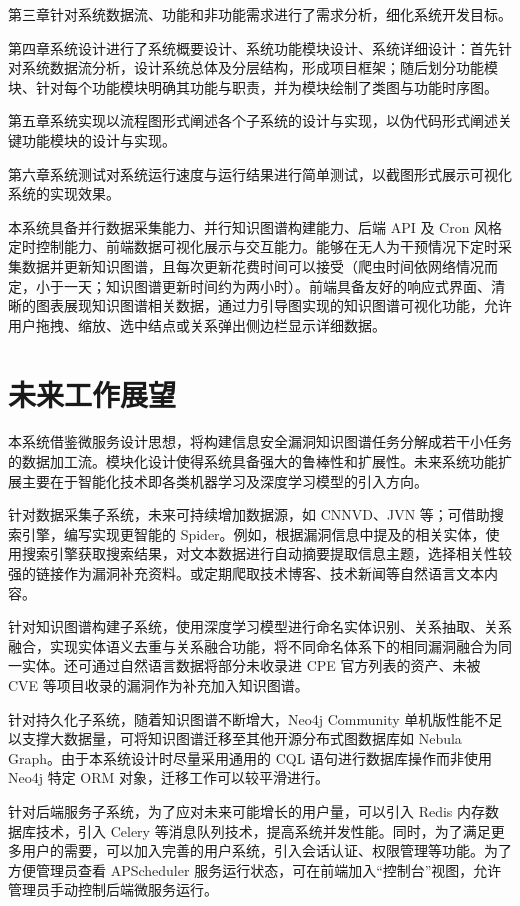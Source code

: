 \documentclass[a4paper,AutoFakeBold,oneside,12pt]{book}
\begin{document}
第三章针对系统数据流、功能和非功能需求进行了需求分析，细化系统开发目标。

第四章系统设计进行了系统概要设计、系统功能模块设计、系统详细设计：首先针对系统数据流分析，设计系统总体及分层结构，形成项目框架；随后划分功能模块、针对每个功能模块明确其功能与职责，并为模块绘制了类图与功能时序图。

第五章系统实现以流程图形式阐述各个子系统的设计与实现，以伪代码形式阐述关键功能模块的设计与实现。

第六章系统测试对系统运行速度与运行结果进行简单测试，以截图形式展示可视化系统的实现效果。

本系统具备并行数据采集能力、并行知识图谱构建能力、后端 API 及 Cron 风格定时控制能力、前端数据可视化展示与交互能力。能够在无人为干预情况下定时采集数据并更新知识图谱，且每次更新花费时间可以接受（爬虫时间依网络情况而定，小于一天；知识图谱更新时间约为两小时）。前端具备友好的响应式界面、清晰的图表展现知识图谱相关数据，通过力引导图实现的知识图谱可视化功能，允许用户拖拽、缩放、选中结点或关系弹出侧边栏显示详细数据。

\section{未来工作展望}

本系统借鉴微服务设计思想，将构建信息安全漏洞知识图谱任务分解成若干小任务的数据加工流。模块化设计使得系统具备强大的鲁棒性和扩展性。未来系统功能扩展主要在于智能化技术即各类机器学习及深度学习模型的引入方向。

针对数据采集子系统，未来可持续增加数据源，如 CNNVD、JVN 等；可借助搜索引擎，编写实现更智能的 Spider。例如，根据漏洞信息中提及的相关实体，使用搜索引擎获取搜索结果，对文本数据进行自动摘要提取信息主题，选择相关性较强的链接作为漏洞补充资料。或定期爬取技术博客、技术新闻等自然语言文本内容。

针对知识图谱构建子系统，使用深度学习模型进行命名实体识别、关系抽取、关系融合，实现实体语义去重与关系融合功能，将不同命名体系下的相同漏洞融合为同一实体。还可通过自然语言数据将部分未收录进 CPE 官方列表的资产、未被 CVE 等项目收录的漏洞作为补充加入知识图谱。

针对持久化子系统，随着知识图谱不断增大，Neo4j Community 单机版性能不足以支撑大数据量，可将知识图谱迁移至其他开源分布式图数据库如 Nebula Graph。由于本系统设计时尽量采用通用的 CQL 语句进行数据库操作而非使用 Neo4j 特定 ORM 对象，迁移工作可以较平滑进行。

针对后端服务子系统，为了应对未来可能增长的用户量，可以引入 Redis 内存数据库技术，引入 Celery 等消息队列技术，提高系统并发性能。同时，为了满足更多用户的需要，可以加入完善的用户系统，引入会话认证、权限管理等功能。为了方便管理员查看 APScheduler 服务运行状态，可在前端加入``控制台''视图，允许管理员手动控制后端微服务运行。
\end{document}
